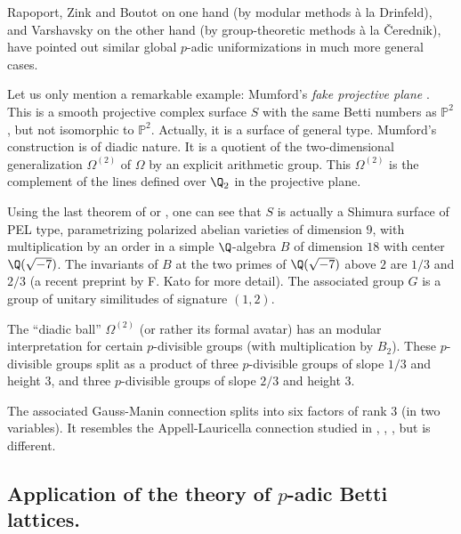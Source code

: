 \begin{para}\label{para:7.5.4}
 Rapoport, Zink and Boutot on one hand (by modular methods \`a la
 Drinfeld), and Varshavsky on the other hand (by group-theoretic methods
 \`a la \v{C}erednik), have pointed out similar global
 $p$-adic uniformizations in much more general cases.

 Let us only mention a remarkable example: Mumford's {\it fake
 projective plane} \cite{aaswkak9pq0}. This is a smooth projective complex
 surface $S$ with the same Betti numbers as $\mathbb{P}^2$, but not
 isomorphic to $\mathbb{P}^2$. Actually, it is a surface of general
 type. Mumford's construction is of diadic nature. It is a quotient of
 the two-dimensional generalization $\Omega^{(2)}$ of $\Omega$ by an
 explicit arithmetic group. This $\Omega^{(2)}$ is the complement of the
 lines defined over $\Q_2$ in the projective plane.

 Using the last theorem of \cite{psfpg} or \cite{varshavsky98:_shimur_ii}, one can see
 that $S$ is actually a Shimura surface of PEL type, parametrizing
 polarized abelian varieties of dimension $9$, with multiplication by an
 order in a simple $\Q$-algebra $B$ of dimension $18$ with center
 $\Q(\sqrt{-7})$. The invariants of $B$ at the two primes of
 $\Q(\sqrt{-7})$ above $2$ are $1/3$ and $2/3$ (\cf a recent
 preprint by F. Kato for more detail). The associated group $G$ is a
 group of unitary similitudes of signature $(1,2)$.


 The ``diadic ball'' $\Omega^{(2)}$ (or rather its formal avatar) has an
 modular interpretation for certain $p$-divisible groups (with
 multiplication by $B_2$). These $p$-divisible groups split as a product
 of three $p$-divisible groups of slope $1/3$ and height $3$, and three
 $p$-divisible groups of slope $2/3$ and height $3$.


 The associated Gauss-Manin connection splits into six factors of rank
 $3$ (in two variables). It resembles the Appell-Lauricella connection
 studied in \cite{pdrefapdfhdpv}, \cite{calip}, \cite{fde}, but is different.
\end{para}

\subsection{Application of the theory of $p$-adic Betti lattices.}
\label{sub:7.6}

